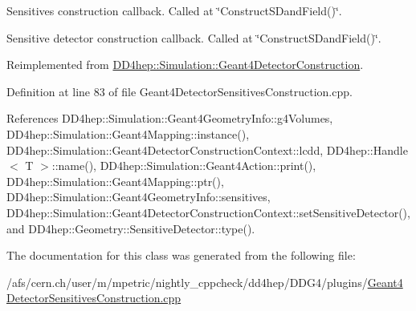 Sensitives construction callback. Called at \char`\"{}\+Construct\+S\+Dand\+Field()\char`\"{}. 

Sensitive detector construction callback. Called at \char`\"{}\+Construct\+S\+Dand\+Field()\char`\"{}. 

Reimplemented from \hyperlink{class_d_d4hep_1_1_simulation_1_1_geant4_detector_construction_a852a3cd581f106a1f8c65122fb517dab}{D\+D4hep\+::\+Simulation\+::\+Geant4\+Detector\+Construction}.



Definition at line 83 of file Geant4\+Detector\+Sensitives\+Construction.\+cpp.



References D\+D4hep\+::\+Simulation\+::\+Geant4\+Geometry\+Info\+::g4\+Volumes, D\+D4hep\+::\+Simulation\+::\+Geant4\+Mapping\+::instance(), D\+D4hep\+::\+Simulation\+::\+Geant4\+Detector\+Construction\+Context\+::lcdd, D\+D4hep\+::\+Handle$<$ T $>$\+::name(), D\+D4hep\+::\+Simulation\+::\+Geant4\+Action\+::print(), D\+D4hep\+::\+Simulation\+::\+Geant4\+Mapping\+::ptr(), D\+D4hep\+::\+Simulation\+::\+Geant4\+Geometry\+Info\+::sensitives, D\+D4hep\+::\+Simulation\+::\+Geant4\+Detector\+Construction\+Context\+::set\+Sensitive\+Detector(), and D\+D4hep\+::\+Geometry\+::\+Sensitive\+Detector\+::type().



The documentation for this class was generated from the following file\+:\begin{DoxyCompactItemize}
\item 
/afs/cern.\+ch/user/m/mpetric/nightly\+\_\+cppcheck/dd4hep/\+D\+D\+G4/plugins/\hyperlink{_geant4_detector_sensitives_construction_8cpp}{Geant4\+Detector\+Sensitives\+Construction.\+cpp}\end{DoxyCompactItemize}
